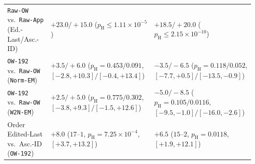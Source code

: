 \documentclass[10pt]{article}
\renewcommand{\_}{\origunderscore\allowbreak}
\begin{document}
\begin{table}[t]
{\begin{tabular}{@{}lccccc@{}}
\texttt{Raw-OW} vs.\ \texttt{Raw-App} (Ed.-Last/Asc.-ID) & \multicolumn{2}{l}{$+23.0/+15.0$ ($p_{\text{H}}\le 1.11\times 10^{-5}$)} & \multicolumn{3}{l}{$+18.5/+20.0$ ($p_{\text{H}}\le 2.15\times 10^{-10}$)} \\
\texttt{OW-192} vs.\ \texttt{Raw-OW} (\texttt{Norm-EM}) & \multicolumn{2}{l}{$+3.5/+6.0$ ($p_{\text{H}}=0.453/0.091$, $[-2.8,+10.3]/[-0.4,+13.4]$)} & \multicolumn{3}{l}{$-3.5/-6.5$ ($p_{\text{H}}=0.118/0.052$, $[-7.7,+0.5]/[-13.5,-0.9]$)} \\
\texttt{OW-192} vs.\ \texttt{Raw-OW} (\texttt{W2N-EM}) & \multicolumn{2}{l}{$+2.5/+5.0$ ($p_{\text{H}}=0.775/0.302$, $[-3.8,+9.3]/[-1.5,+12.6]$)} & \multicolumn{3}{l}{$-5.0/-8.5$ ($p_{\text{H}}=0.105/\mathbf{0.0116}$, $[-9.5,-1.0]/[-16.0,-2.6]$)} \\
Order Edited-Last vs.\ Asc.-ID (\texttt{OW-192}) & \multicolumn{2}{l}{$+8.0$ ($17$--$1$, $p_{\text{H}}=7.25\times 10^{-4}$, $[+3.7,+13.2]$)} & \multicolumn{3}{l}{$+6.5$ ($15$--$2$, $p_{\text{H}}=0.0118$, $[+1.9,+12.1]$)} \\
\bottomrule
\end{tabular}%
}
\end{table}
\end{document}
